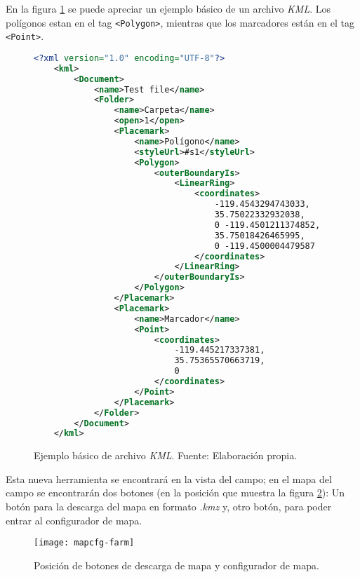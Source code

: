 En la figura \ref{fig:ejemplo_kml} se puede apreciar un ejemplo básico de un archivo \textit{KML}. Los polígonos estan en el tag \texttt{<Polygon>}, mientras que los marcadores están en el tag \texttt{<Point>}.
\begin{figure}[H]
    \centering
    \begin{lstlisting}[language=XML, frame=single]
    <?xml version="1.0" encoding="UTF-8"?>
    <kml>
        <Document>
            <name>Test file</name>                        
            <Folder>
                <name>Carpeta</name>
                <open>1</open>
                <Placemark>
                    <name>Polígono</name>
                    <styleUrl>#s1</styleUrl>
                    <Polygon>
                        <outerBoundaryIs>
                            <LinearRing>
                                <coordinates>
                                    -119.4543294743033,
                                    35.75022332932038,
                                    0 -119.4501211374852,
                                    35.75018426465995,
                                    0 -119.4500004479587
                                </coordinates>
                            </LinearRing>
                        </outerBoundaryIs>
                    </Polygon>
                </Placemark>            
                <Placemark>
                    <name>Marcador</name>
                    <Point>
                        <coordinates>
                            -119.445217337381,
                            35.75365570663719,
                            0
                        </coordinates>
                    </Point>
                </Placemark>   
            </Folder>         
        </Document>
    </kml>        
    \end{lstlisting}
    \caption{Ejemplo básico de archivo \textit{KML}. Fuente: Elaboración propia.}
    \label{fig:ejemplo_kml}
\end{figure}

Esta nueva herramienta se encontrará en la vista del campo; en el mapa del campo se encontrarán dos botones (en la posición que muestra la figura \ref{fig:mapcfg-farm}): Un botón para la descarga del mapa en formato \textit{.kmz} y, otro botón, para poder entrar al configurador de mapa.
\begin{figure}[H]
	\centering
	\texttt{[image: mapcfg-farm]}
	\caption{\label{fig:mapcfg-farm} Posición de botones de descarga de mapa y configurador de mapa.}
\end{figure}

